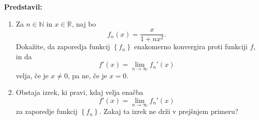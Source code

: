 \textbf{Predstavil: }

\begin{enumerate}
  \item Za $n \in \mathbb{N}$ in $x \in \mathbb{R}$, naj bo \[f_{n}(x) = \frac{x}{1+nx^{2}}.\]  Dokažite, da zaporedja funkcij $\left\{ f_{n} \right\}$ enakomerno konvergira proti funkciji $f$, in da \[f'(x) = \lim_{n \to \infty} f_{n}'(x)\] velja, če je $x \neq 0$, pa ne, če je $x=0$.  
  \item Obstaja izrek, ki pravi, kdaj velja enačba \[f'(x) = \lim_{n \to \infty} f_{n}'(x)\] za zaporedje funkcij $\left\{ f_{n} \right\}$. Zakaj ta izrek ne drži v prejšnjem primeru?
\end{enumerate}